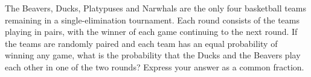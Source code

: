 The Beavers, Ducks, Platypuses and Narwhals are the only four basketball teams remaining in a single-elimination tournament. Each round consists of the teams playing in pairs, with the winner of each game continuing to the next round. If the teams are randomly paired and each team has an equal probability of winning any game, what is the probability that the Ducks and the Beavers play each other in one of the two rounds? Express your answer as a common fraction.
